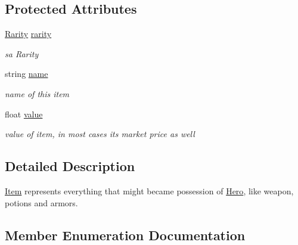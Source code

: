 \subsection*{Protected Attributes}
\begin{DoxyCompactItemize}
\item 
\hyperlink{class_item_ab29041c9ccfd11419abe6f39ac90bb6a}{Rarity} \hyperlink{class_item_a1f3f4bfb63dd89ef503b7295d7d89dc2}{rarity}\hypertarget{class_item_a1f3f4bfb63dd89ef503b7295d7d89dc2}{}\label{class_item_a1f3f4bfb63dd89ef503b7295d7d89dc2}

\begin{DoxyCompactList}\small\item\em sa Rarity \end{DoxyCompactList}\item 
string \hyperlink{class_item_a406cde7962a6b42a66b4a53c9a26db2c}{name}\hypertarget{class_item_a406cde7962a6b42a66b4a53c9a26db2c}{}\label{class_item_a406cde7962a6b42a66b4a53c9a26db2c}

\begin{DoxyCompactList}\small\item\em name of this item \end{DoxyCompactList}\item 
float \hyperlink{class_item_a3aaeadb0f6d5894504328e4ca91786b6}{value}\hypertarget{class_item_a3aaeadb0f6d5894504328e4ca91786b6}{}\label{class_item_a3aaeadb0f6d5894504328e4ca91786b6}

\begin{DoxyCompactList}\small\item\em value of item, in most cases it\textquotesingle{}s market price as well \end{DoxyCompactList}\end{DoxyCompactItemize}


\subsection{Detailed Description}
\hyperlink{class_item}{Item} represents everything that might became possession of \hyperlink{class_hero}{Hero}, like weapon, potions and armors. 



\subsection{Member Enumeration Documentation}
